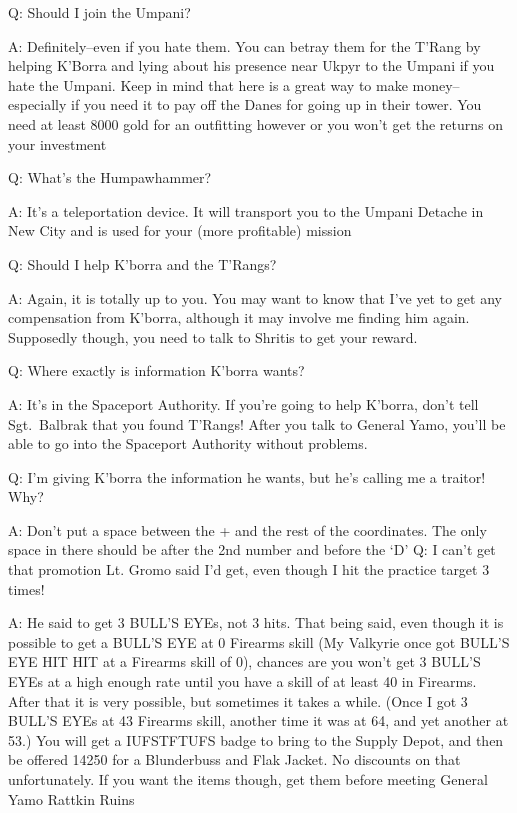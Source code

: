 \documentclass[12pt]{article}
\begin{document}
Q: Should I join the Umpani?

A: Definitely--even if you hate them. You can betray them for the T'Rang
by helping K'Borra and lying about his presence near Ukpyr to the Umpani
if you hate the Umpani. Keep in mind that here is a great way to make
money--especially if you need it to pay off the Danes for going up in
their tower. You need at least 8000 gold for an outfitting however or
you won't get the returns on your investment

Q: What's the Humpawhammer?

A: It's a teleportation device. It will transport you to the Umpani
Detache in New City and is used for your (more profitable) mission

Q: Should I help K'borra and the T'Rangs?

A: Again, it is totally up to you. You may want to know that I've yet to
get any compensation from K'borra, although it may involve me finding
him again. Supposedly though, you need to talk to Shritis to get your
reward.

Q: Where exactly is information K'borra wants?

A: It's in the Spaceport Authority. If you're going to help K'borra,
don't tell Sgt.~Balbrak that you found T'Rangs! After you talk to
General Yamo, you'll be able to go into the Spaceport Authority without
problems.

Q: I'm giving K'borra the information he wants, but he's calling me a
traitor! Why?

A: Don't put a space between the + and the rest of the coordinates. The
only space in there should be after the 2nd number and before the `D' Q:
I can't get that promotion Lt. Gromo said I'd get, even though I hit the
practice target 3 times!

A: He said to get 3 BULL'S EYEs, not 3 hits. That being said, even
though it is possible to get a BULL'S EYE at 0 Firearms skill (My
Valkyrie once got BULL'S EYE HIT HIT at a Firearms skill of 0), chances
are you won't get 3 BULL'S EYEs at a high enough rate until you have a
skill of at least 40 in Firearms. After that it is very possible, but
sometimes it takes a while. (Once I got 3 BULL'S EYEs at 43 Firearms
skill, another time it was at 64, and yet another at 53.) You will get a
IUFSTFTUFS badge to bring to the Supply Depot, and then be offered 14250
for a Blunderbuss and Flak Jacket. No discounts on that unfortunately.
If you want the items though, get them before meeting General Yamo
Rattkin Ruins
\end{document}
